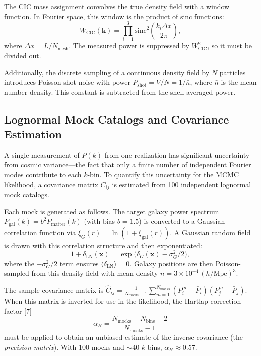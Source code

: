 \documentclass[10pt]{article}
\begin{document}
The CIC mass assignment convolves the true density field with a window function.  In Fourier space, this window is the product of sinc functions:
\begin{equation}
  W_{\mathrm{CIC}}(\mathbf{k}) = \prod_{i=1}^{3} \mathrm{sinc}^2\!\left(\frac{k_i \Delta x}{2\pi}\right),
\end{equation}
where $\Delta x = L/N_{\mathrm{mesh}}$.  The measured power is suppressed by $W_{\mathrm{CIC}}^2$, so it must be divided out.

Additionally, the discrete sampling of a continuous density field by $N$ particles introduces Poisson shot noise with power $P_{\mathrm{shot}} = V/N = 1/\bar{n}$, where $\bar{n}$ is the mean number density.  This constant is subtracted from the shell-averaged power.

\subsection{Lognormal Mock Catalogs and Covariance Estimation}

A single measurement of $P(k)$ from one realization has significant uncertainty from cosmic variance---the fact that only a finite number of independent Fourier modes contribute to each $k$-bin.  To quantify this uncertainty for the MCMC likelihood, a covariance matrix $C_{ij}$ is estimated from 100 independent lognormal mock catalogs.

Each mock is generated as follows.  The target galaxy power spectrum $P_{\mathrm{gal}}(k) = b^2 P_{\mathrm{matter}}(k)$ (with bias $b = 1.5$) is converted to a Gaussian correlation function via $\xi_G(r) = \ln(1 + \xi_{\mathrm{gal}}(r))$.  A Gaussian random field is drawn with this correlation structure and then exponentiated:
\begin{equation}
  1 + \delta_{\mathrm{LN}}(\mathbf{x}) = \exp\!\bigl(\delta_G(\mathbf{x}) - \sigma_G^2/2\bigr),
\end{equation}
where the $-\sigma_G^2/2$ term ensures $\langle \delta_{\mathrm{LN}} \rangle = 0$.  Galaxy positions are then Poisson-sampled from this density field with mean density $\bar{n} = 3 \times 10^{-4}\,(h/\mathrm{Mpc})^3$.

The sample covariance matrix is $\hat{C}_{ij} = \frac{1}{N_{\mathrm{mocks}}-1}\sum_{m=1}^{N_{\mathrm{mocks}}} (P_i^m - \bar{P}_i)(P_j^m - \bar{P}_j)$.  When this matrix is inverted for use in the likelihood, the Hartlap correction factor [7]
\begin{equation}
  \alpha_H = \frac{N_{\mathrm{mocks}} - N_{\mathrm{bins}} - 2}{N_{\mathrm{mocks}} - 1}
\end{equation}
must be applied to obtain an unbiased estimate of the inverse covariance (the \emph{precision matrix}).  With 100 mocks and ${\sim}40$ $k$-bins, $\alpha_H \approx 0.57$.
\end{document}
